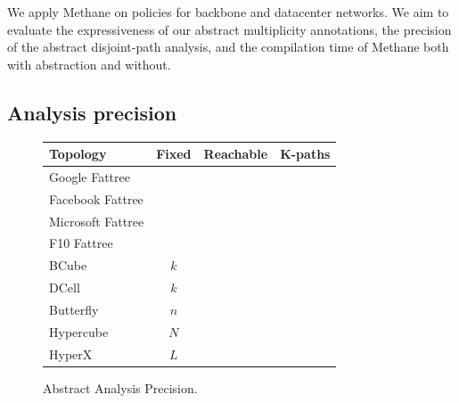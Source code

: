 \documentclass{sig-alternate-10pt}
\newcommand{\cmark}{\ding{51}}
\newcommand{\xmark}{\ding{55}}
\newcommand{\sysname}{{\small \sf Methane}\xspace}
\begin{document}
We apply \sysname on policies for backbone and datacenter networks. We aim to evaluate the expressiveness of our abstract multiplicity annotations, the precision of the abstract disjoint-path analysis, and the compilation time of \sysname both with abstraction and without.

\subsection{Analysis precision}

\begin{figure}[t!]
  \begin{center}
      \begin{tabular}{| l | c | c | c |}
      \hline
      \textbf{Topology} & \textbf{Fixed} & \textbf{Reachable} & \textbf{K-paths} \\ \hline
      Google Fattree & & \cmark & \cmark  \\ \hline
      Facebook Fattree & & \cmark & \cmark \\ \hline
      Microsoft Fattree & & & \\ \hline
      F10 Fattree & & \cmark & \cmark \\ \hline
      BCube & $k$ & \cmark & \xmark \\ \hline
      DCell & $k$ & \cmark & \xmark \\ \hline
      Butterfly & $n$ & \cmark & \cmark \\ \hline
      Hypercube & $N$ & \cmark & \cmark \\ \hline
      HyperX & $L$ & \cmark & \cmark \\ \hline
      \end{tabular}
  \end{center}
  \caption{Abstract Analysis Precision.}
  \label{fig:analysis-precision}
\end{figure}
\end{document}
